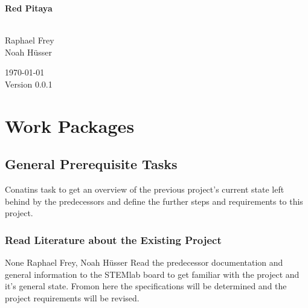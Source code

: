 \documentclass[a4paper,oneside]{alpenspecs/alpenspecs}
\begin{document}
\begin{titlingpage} %
    \flushright\sffamily

    \vspace*{5em}
    \Huge\bfseries{Red Pitaya}\\[1ex]
    \Large{}\\[3ex]

    \normalsize\mdseries

    \vfill
    Raphael Frey\\
    Noah H\"usser\\[3ex]

    \vspace{5em}

    \today\\
    Version 0.0.1
\end{titlingpage} %

\frontmatter %
\tableofcontents*

\mainmatter

\chapter{Work Packages} %
\label{ch:wpac}


\section{General Prerequisite Tasks}
\label{sec:general}

Conatins task to get an overview of the previous project's current state left behind by the predecessors and define the further steps and requirements to this project.

\subsection{Read Literature about the Existing Project}
\label{subsec:general:read}

\wpac
    {}
    {}
    {}
    {None}
    {}
    {Raphael Frey, Noah Hüsser}
    {%
        Read the predecessor documentation and general information to the STEMlab board to get familiar with the project and it's general state.
        Fromon here the specifications will be determined and the project requirements will be revised.
    }
\end{document}
